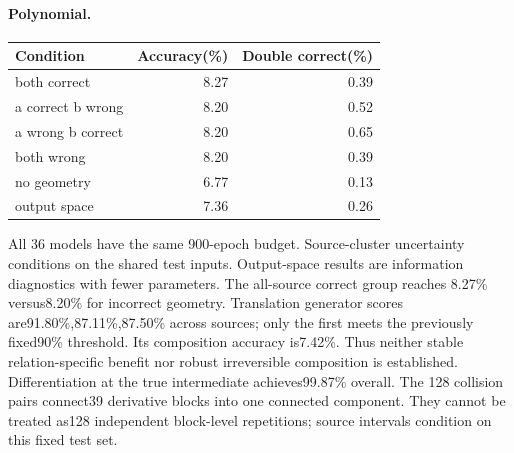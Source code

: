 \paragraph{Polynomial.}
\begin{center}\begin{tabular}{lrr}\toprule Condition & Accuracy(\%) & Double correct(\%)\\\midrule
both correct & 8.27 & 0.39\\
a correct b wrong & 8.20 & 0.52\\
a wrong b correct & 8.20 & 0.65\\
both wrong & 8.20 & 0.39\\
no geometry & 6.77 & 0.13\\
output space & 7.36 & 0.26\\
\bottomrule\end{tabular}\end{center}
All 36 models have the same 900-epoch budget. Source-cluster uncertainty conditions on the shared test inputs. Output-space results are information diagnostics with fewer parameters.
The all-source correct group reaches 8.27\% versus8.20\% for incorrect geometry. Translation generator scores are91.80\%,87.11\%,87.50\% across sources; only the first meets the previously fixed90\% threshold. Its composition accuracy is7.42\%. Thus neither stable relation-specific benefit nor robust irreversible composition is established. Differentiation at the true intermediate achieves99.87\% overall.
The 128 collision pairs connect39 derivative blocks into one connected component. They cannot be treated as128 independent block-level repetitions; source intervals condition on this fixed test set.
